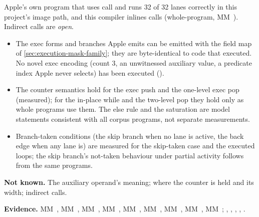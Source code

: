 Apple's own program that uses call and  runs 32 of 32 lanes correctly in this
project's image path, and this compiler inlines calls (whole-program, MM~). Indirect calls are \emph{open}.


\begin{itemize}
\item The exec forms and branches Apple emits can be emitted with the field map of \cref{sec:execution-mask-family}; they
  are byte-identical to code that executed. No novel exec encoding (count 3, an unwitnessed auxiliary value, a predicate index Apple never selects) has been
  executed ().
\item The counter semantics hold for the exec push and the one-level exec pop (measured); for the in-place while and
  the two-level pop they hold only as whole programs use them. The else rule and the saturation are model statements consistent with all corpus programs, not
  separate measurements.
\item Branch-taken conditions (the skip branch when no lane is active, the back edge when any lane is) are measured for the
  skip-taken case and the executed loops; the skip branch's not-taken behaviour under partial activity follows from the
  same programs.
\end{itemize}

\textbf{Not known.} The auxiliary operand's meaning; where the counter is held and its width; indirect calls.

\textbf{Evidence.} MM~, MM~, MM~, MM~, MM~, MM~, MM~, MM~, MM~;
, , , ,
.
